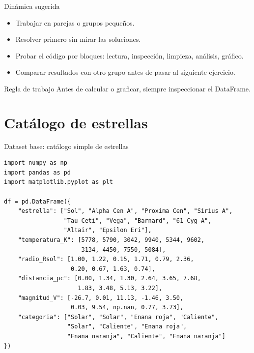 \documentclass[10pt]{beamer}
\begin{document}
\begin{frame}{Dinámica sugerida}
  \begin{itemize}
    \item Trabajar en parejas o grupos pequeños.
    \item Resolver primero sin mirar las soluciones.
    \item Probar el código por bloques: lectura, inspección, limpieza, análisis, gráfico.
    \item Comparar resultados con otro grupo antes de pasar al siguiente ejercicio.
  \end{itemize}
  \begin{block}{Regla de trabajo}
    Antes de calcular o graficar, siempre inspeccionar el DataFrame.
  \end{block}
\end{frame}

\section{Catálogo de estrellas}

\begin{frame}[fragile,shrink=8]{Dataset base: catálogo simple de estrellas}
\begin{verbatim}
import numpy as np
import pandas as pd
import matplotlib.pyplot as plt

df = pd.DataFrame({
    "estrella": ["Sol", "Alpha Cen A", "Proxima Cen", "Sirius A",
                 "Tau Ceti", "Vega", "Barnard", "61 Cyg A",
                 "Altair", "Epsilon Eri"],
    "temperatura_K": [5778, 5790, 3042, 9940, 5344, 9602,
                      3134, 4450, 7550, 5084],
    "radio_Rsol": [1.00, 1.22, 0.15, 1.71, 0.79, 2.36,
                   0.20, 0.67, 1.63, 0.74],
    "distancia_pc": [0.00, 1.34, 1.30, 2.64, 3.65, 7.68,
                     1.83, 3.48, 5.13, 3.22],
    "magnitud_V": [-26.7, 0.01, 11.13, -1.46, 3.50,
                   0.03, 9.54, np.nan, 0.77, 3.73],
    "categoria": ["Solar", "Solar", "Enana roja", "Caliente",
                  "Solar", "Caliente", "Enana roja",
                  "Enana naranja", "Caliente", "Enana naranja"]
})
\end{verbatim}
\end{frame}
\end{document}
